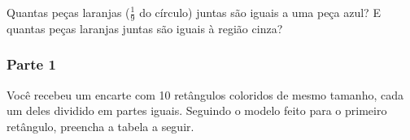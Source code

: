 \begin{refletindo*}{}{}
Quantas peças laranjas ($\frac{1}{9}$ do círculo) juntas são iguais a uma peça azul? E quantas peças laranjas juntas são iguais à região cinza? 

  \end{refletindo*}
\clearpage

\begin{atividade}
\label{chap4-ativ6}
\newcommand\fit[1]{\parbox[c][1.5cm]{\linewidth}{\centering#1}}

\subsubsection{Parte 1}

Você recebeu um encarte com 10 retângulos coloridos de mesmo tamanho, cada um deles dividido em partes iguais. Seguindo o modelo feito para o primeiro retângulo, preencha a tabela a seguir.
\centering


\end{atividade}
